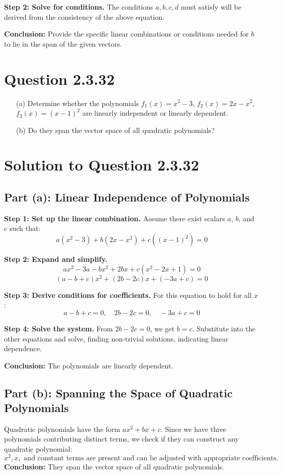 \documentclass[12pt]{article}
\begin{document}
\textbf{Step 2: Solve for conditions.} The conditions \(a, b, c, d\) must satisfy will be derived from the consistency of the above equation.

\textbf{Conclusion:} Provide the specific linear combinations or conditions needed for \(b\) to lie in the span of the given vectors.


\newpage
\section*{Question 2.3.32}
\begin{itemize}
    \item[(a)] Determine whether the polynomials \(f_1(x) = x^2 - 3\), \(f_2(x) = 2x - x^2\), \(f_3(x) = (x - 1)^2\) are linearly independent or linearly dependent.
    \item[(b)] Do they span the vector space of all quadratic polynomials?
\end{itemize}

\section*{Solution to Question 2.3.32}

\subsection*{Part (a): Linear Independence of Polynomials}
\textbf{Step 1: Set up the linear combination.}
Assume there exist scalars \(a\), \(b\), and \(c\) such that:
\[
a(x^2 - 3) + b(2x - x^2) + c((x - 1)^2) = 0
\]

\textbf{Step 2: Expand and simplify.}
\[
a x^2 - 3a - b x^2 + 2bx + c(x^2 - 2x + 1) = 0
\]
\[
(a - b + c)x^2 + (2b - 2c)x + (-3a + c) = 0
\]

\textbf{Step 3: Derive conditions for coefficients.}
For this equation to hold for all \(x\):
\[
a - b + c = 0, \quad 2b - 2c = 0, \quad -3a + c = 0
\]

\textbf{Step 4: Solve the system.}
From \(2b - 2c = 0\), we get \(b = c\).
Substitute into the other equations and solve, finding non-trivial solutions, indicating linear dependence.

\textbf{Conclusion:} The polynomials are linearly dependent.

\subsection*{Part (b): Spanning the Space of Quadratic Polynomials}
Quadratic polynomials have the form \(ax^2 + bx + c\). Since we have three polynomials contributing distinct terms, we check if they can construct any quadratic polynomial:
\[
x^2, x, \text{ and constant terms are present and can be adjusted with appropriate coefficients.}
\]
\textbf{Conclusion:} They span the vector space of all quadratic polynomials.
\end{document}

